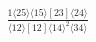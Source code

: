 \documentclass[varwidth, border=5pt]{standalone}
\begin{document}
\begin{my}
$\begin{gathered}
\scriptscriptstyle\frac{1⟨25⟩⟨15⟩[23]⟨24⟩}{⟨12⟩[12]⟨14⟩^2⟨34⟩}
\end{gathered}$
\end{my}
\end{document}
